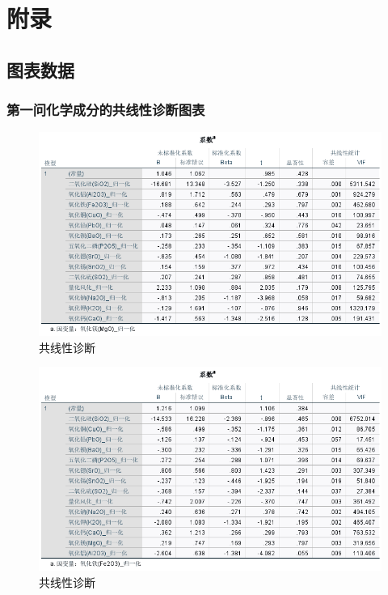 \documentclass[UTF8]{ctexart}
\begin{document}
\section*{附录}
\subsection*{图表数据}

\subsubsection*{第一问化学成分的共线性诊断图表}
\begin{figure}[H]\centering
    \includegraphics[width=1\textwidth,height=0.6\textwidth]{img/1 (1).png} %
    \caption{共线性诊断} %
\end{figure}
\begin{figure}[H]\centering
    \includegraphics[width=1\textwidth,height=0.6\textwidth]{img/1 (2).png} %
    \caption{共线性诊断} %
\end{figure}
\end{document}
